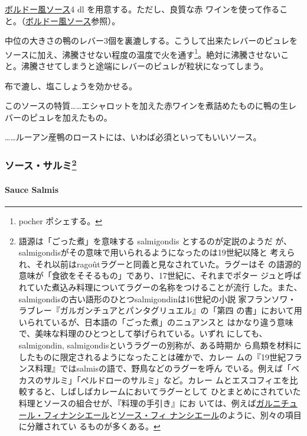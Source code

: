 \protect\hyperlink{sauce-bordelaise}{ボルドー風ソース}4 dl
を用意する。ただし、良質な赤
ワインを使って作ること。（\protect\hyperlink{sauce-bordelaise}{ボルドー風ソース}参照）。

中位の大きさの鴨のレバー3個を裏漉しする。こうして出来たレバーのピュレをソースに加え、沸騰させない程度の温度で火を通す\footnote{pocher
  ポシェする。}。絶対に沸騰させないこと。沸騰させてしまうと途端にレバーのピュレが粒状になってしまう。

布で漉し、塩こしょうを効かせる。

このソースの特質\ldots{}\ldots{}エシャロットを加えた赤ワインを煮詰めたものに鴨の生レバーのピュレを加えたもの。

\ldots{}\ldots{}ルーアン産鴨のローストには、いわば必須といってもいいソース。

\maeaki

\hypertarget{ux30bdux30fcux30b9ux30b5ux30ebux30df92}{%
\subsubsection[ソース・サルミ]{\texorpdfstring{ソース・サルミ\footnote{語源は「ごった煮」を意味する
  salmigondis とするのが定説のようだ
  が、salmigondisがその意味で用いられるようになったのは19世紀以降と
  考えられ、それ以前はragoûtラグーと同義と見なされていた。ラグーはそ
  の語源的意味が「食欲をそそるもの」であり、17世紀に、それまでポター
  ジュと呼ばれていた煮込み料理についてラグーの名称をつけることが流行
  した。また、salmigondisの古い語形のひとつsalmigondinは16世紀の小説
  家フランソワ・ラブレー『ガルガンチュアとパンタグリュエル』の「第四
  の書」において用いられているが、日本語の「ごった煮」のニュアンスと
  はかなり違う意味で、美味な料理のひとつとして挙げられている。いずれ
  にしても、salmigondin, salmigondisというラグーの別称が、ある時期か
  ら鳥類を材料にしたものに限定されるようになったことは確かで、カレー
  ムの『19世紀フランス料理』ではsalmisの語で、野鳥などのラグーを呼ん
  でいる。例えば「ベカスのサルミ」「ペルドローのサルミ」など。カレー
  ムとエスコフィエを比較すると、しばしばカレームにおいてラグーとして
  ひとまとめにされていた料理とソースの組合せが、『料理の手引き』にお
  いては、例えば\href{}{ガルニチュール・フィナンシエール}と\protect\hyperlink{sauce-financiere}{ソース・フィ
  ナンシエール}のように、別々の項目に分離されてい るものが多くある。}}{ソース・サルミ}}\label{ux30bdux30fcux30b9ux30b5ux30ebux30df92}}

\hypertarget{sauce-salmis}{%
\paragraph{Sauce Salmis}\label{sauce-salmis}}


